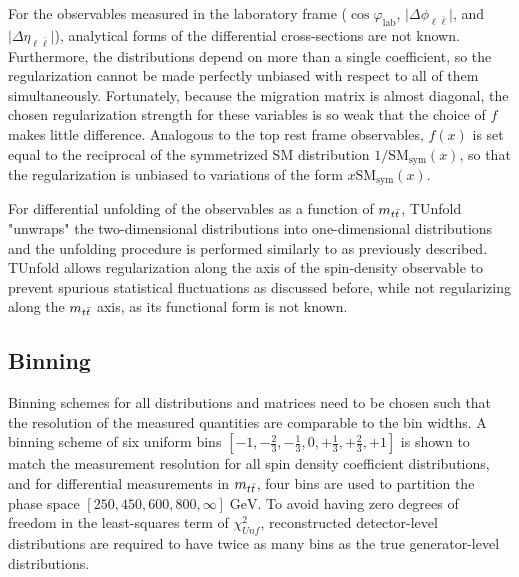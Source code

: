 For the observables measured in the laboratory frame ($\cos\varphi_{\mathrm{lab}}$, $\vert \Delta\phi_{\ell\bar{\ell}} \vert$, and $\vert \Delta\eta_{\ell\bar{\ell}} \vert$), analytical forms of the differential cross-sections are not known. 
Furthermore, the distributions depend on more than a single coefficient, so the regularization cannot be made perfectly unbiased with respect to all of them simultaneously. 
Fortunately, because the migration matrix is almost diagonal, the chosen regularization strength for these variables is so weak that the choice of $f$ makes little difference. 
Analogous to the top rest frame observables, $f(x)$ is set equal to the reciprocal of the symmetrized SM distribution $1/\mathrm{SM_{sym}}(x)$, so that the regularization is unbiased to variations of the form $x \mathrm{SM_{sym}}(x)$. 

For differential unfolding of the observables as a function of $m_{t\bar{t}}$, TUnfold "unwraps" the two-dimensional distributions into one-dimensional distributions and the unfolding procedure is performed similarly to as previously described. 
TUnfold allows regularization along the axis of the spin-density observable to prevent spurious statistical fluctuations as discussed before, while not regularizing along the $m_{t\bar{t}}$ axis, as its functional form is not known.


\subsection{Binning}
\label{Binning}
Binning schemes for all distributions and matrices need to be chosen such that the resolution of the measured quantities are comparable to the bin widths.
A binning scheme of six uniform bins $[-1,-\frac{2}{3},-\frac{1}{3},0,+\frac{1}{3},+\frac{2}{3},+1]$ is shown to match the measurement resolution for all spin density coefficient distributions, and for differential measurements in $m_{t\bar{t}}$, four bins are used to partition the phase space $[250,450,600,800,\infty] \; \si{\GeV}$.
To avoid having zero degrees of freedom in the least-squares term of $\chi^{2}_{Unf}$, reconstructed detector-level distributions are required to have twice as many bins as the true generator-level distributions.

